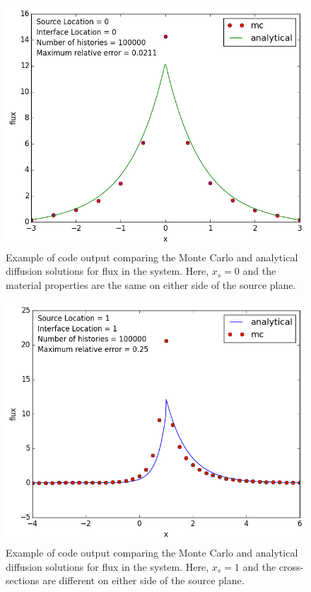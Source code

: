 \documentclass[11pt, oneside]{article}   	%
\begin{document}
\begin{figure}
\centering
  \includegraphics[width=12cm, keepaspectratio,]{an_result1}
  \caption{Example of code output comparing the Monte Carlo and analytical diffusion solutions for flux in the system. Here, $x_s = 0$ and the material properties are the same on either side of the source plane.}
  \label{fig:an_result1}
\end{figure}

\begin{figure}
\centering
  \includegraphics[width=12cm, keepaspectratio,]{an_result2}
  \caption{Example of code output comparing the Monte Carlo and analytical diffusion solutions for flux in the system. Here, $x_s = 1$ and the cross-sections are different on either side of the source plane.}
  \label{fig:an_result2}
\end{figure}
\end{document}
